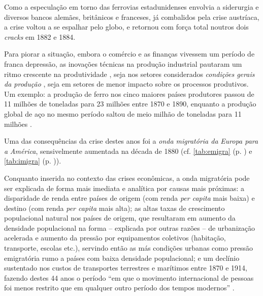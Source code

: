 Como a especulação em torno das ferrovias estadunidenses envolvia a siderurgia e diversos bancos alemães, britânicos e franceses, já combalidos pela crise austríaca, a crise voltou a se espalhar pelo globo, e retornou com força total noutros dois \textit{cracks} em 1882 e 1884.

Para piorar a situação, embora o comércio e as finanças vivessem um período de franca depressão, as inovações técnicas na produção industrial pautaram um ritmo crescente na produtividade \cite{hobsbawm_empire_1989}, seja nos setores considerados \textit{condições gerais da produção} \cite[p.~155-162]{BERNARDO1991}, seja em setores de menor impacto sobre os processos produtivos. Um exemplo: a produção de ferro nos cinco maiores países produtores passou de 11 milhões de toneladas para 23 milhões entre 1870 e 1890, enquanto a produção global de aço no mesmo período saltou de meio milhão de toneladas para 11 milhões \cite[p.~35]{hobsbawm_empire_1989}.

Uma das consequências da crise destes anos foi a \textit{onda migratória da} \textit{Europa para a }\textit{América}, sensivelmente aumentada na década de 1880 (cf. \autoref{tab:emigra} (p. \pageref{tab:emigra}) e \autoref{tab:imigra} (p. \pageref{tab:imigra})).





Conquanto inserida no contexto das crises econômicas, a onda migratória pode ser explicada de forma mais imediata e analítica por causas mais próximas: a disparidade de renda entre países de origem (com renda \textit{per capita} mais baixa) e destino (com renda \textit{per capita} mais alta); as altas taxas de crescimento populacional natural nos países de origem, que resultaram em aumento da densidade populacional na forma -- explicada por outras razões -- de urbanização acelerada e aumento da pressão por equipamentos coletivos (habitação, transporte, escolas etc.), servindo então as más condições urbanas como pressão emigratória rumo a países com baixa densidade populacional; e um declínio sustentado nos custos de transportes terrestres e marítimos entre 1870 e 1914, fazendo destes 44 anos o período ``em que o movimento internacional de pessoas foi menos restrito que em qualquer outro período dos tempos modernos'' \cite[p.~616]{heitger_migration_1993}.

